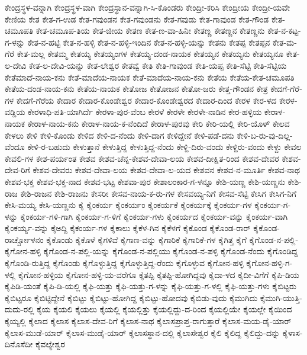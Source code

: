 ಕೇಂದ್ರಸ್ಥಳ-ವನ್ನಾಗಿ
ಕೇಂದ್ರಸ್ಥಳ-ವಾಗಿ
ಕೇಂದ್ರಸ್ಥಾನ-ವನ್ನಾಗಿ-ಸಿ-ಕೊಂಡರು
ಕೇಂದ್ರೀ-ಕರಿಸಿ
ಕೇಂದ್ರೀಯ
ಕೇಂದ್ರೀ-ಯವೇ
ಕೇಣಿಯ
ಕೇತ
ಕೇತ-ಗ-ಉಡ
ಕೇತ-ಗವುಂಡನ
ಕೇತ-ಗವುಂಡನು
ಕೇತ-ಗವುಡು
ಕೇತ-ಗಾವುಂಡ
ಕೇತ-ಗೌಂಡ
ಕೇತ-ಚಮೂಪತಿ
ಕೇತ-ಚಮೂಪ-ತಿಯ
ಕೇತ-ಜೀಯ
ಕೇತಣ
ಕೇತ-ಣ-ವಾ-ಹಿನೀ
ಕೇತಣ್ಣ
ಕೇತಣ್ಣನ
ಕೇತಣ್ಣನು
ಕೇತ-ನ-ಕಟ್ಟ-ಗ-ಳನ್ನು
ಕೇತ-ನ-ಹಟ್ಟಿ
ಕೇತ-ನ-ಹಳ್ಳಿ
ಕೇತ-ನ-ಹಳ್ಳಿ-ಇಂದಿನ
ಕೇತ-ನ-ಹಳ್ಳಿ-ಯನ್ನು
ಕೇತನು
ಕೇತಪ್ಪ
ಕೇತಪ್ಪನ
ಕೇತ-ಮ-ಗೆರೆ
ಕೇತ-ಮಲ್ಲ
ಕೇತಮ್ಮ
ಕೇತಯ್ಯ
ಕೇತಯ್ಯಂಗಳ
ಕೇತಯ್ಯ-ದಂಡ-ನಾಯಕ
ಕೇತಯ್ಯನ
ಕೇತಯ್ಯನು
ಕೇತಯ್ಯನೂ
ಕೇತ-ಲ-ದೇವಿ
ಕೇತ-ಲ-ದೇವಿ-ಯನ್ನು
ಕೇತ-ಲೇಶ್ವರ
ಕೇತವ್ವೆ
ಕೇತಿ
ಕೇತಿ-ಗಾವುಂಡ
ಕೇತಿ-ಯಪ್ಪ
ಕೇತಿ-ಸೆಟ್ಟಿ
ಕೇತಿ-ಸೆಟ್ಟಿಯ
ಕೇತೆಮಾದೆ-ನಾಯ-ಕನು
ಕೇತೆ-ಮಾದೆಯ-ನಾಯಕ
ಕೇತೆ-ಮಾದೆಯ-ನಾಯ-ಕನು
ಕೇತೆಯ
ಕೇತೆಯ-ಕೇತ-ಚಮೂಪತಿ
ಕೇತೆಯ-ದಂಡ-ನಾಯ-ಕನು
ಕೇತೆಯ-ನಾಯಕ
ಕೇತೋಜ
ಕೇತೋಜನ
ಕೇತೋ-ಜರು
ಕೇತ್ತ-ಗೌಂಡನ
ಕೇತ್ರ
ಕೇದಗೆ-ಗೆರೆ-ಗಳ
ಕೇದಗೆ-ಗೆರೆಯ
ಕೇದಾರ
ಕೇದಾರ-ಕೊಂಡೇಶ್ವರ
ಕೇದಾರ-ಕೊಂಡೇಶ್ವರದ
ಕೇದಾರ-ದಿಂದ
ಕೇರಳ
ಕೇರ-ಳದ
ಕೇರಳ-ವಡ್ಡಿಯ
ಕೇರಳಾಧಿ-ಪತಿ-ಯಾಗಿರ್ದೆ
ಕೇರಳಾ-ಪುರ-ವೆಂಬ
ಕೇರಳೆ
ಕೇರಳೇ
ಕೇರಳೇ-ನಾಡಿನ
ಕೇರ-ಹಳ್ಳಿಯ
ಕೇರಾಳ-ನಾಯಕ
ಕೇರಾಳ-ನಾಯ-ಕನು
ಕೇರಾಳ-ನಾಯ-ಕ-ನೆಂದಿದೆ
ಕೇರಾಳ-ಪುರವು
ಕೇರಿ
ಕೇರಿ-ಯಲ್ಲಿ
ಕೇರಿ-ಯೊಳ್
ಕೇಲವ
ಕೇಳಲು
ಕೇಳಿ
ಕೇಳಿ-ಕೊಂಡು
ಕೇಳಿದ
ಕೇಳಿ-ದ-ನೆಂದು
ಕೇಳಿ-ದಾಗ
ಕೇಳಿದ್ದೇನೆ
ಕೇಳಿ-ಪಡೆ-ದನು
ಕೇಳಿ-ಬ-ರು-ವು-ದಿಲ್ಲ-ವೆಂದೂ
ಕೇಳಿ-ರ-ಬಹುದು
ಕೇಳುತ್ತಾನೆ
ಕೇಳುತ್ತಿದ್ದ
ಕೇಳುತ್ತಿದ್ದ-ನೆಂದು
ಕೇಳ್ದಿ-ದಿರು-ವಂದು
ಕೇಳ್ದಿರು-ವಂದು
ಕೇಳ್ದು
ಕೇವಲ
ಕೇವಲಿ-ಗಳ
ಕೇಶ-ಪರ್ಯಂತ
ಕೇಶವ
ಕೇಶವ-ಚೆನ್ನ-ಕೇಶವ-ದೇವಾ-ಲಯ
ಕೇಶವ-ದೀಕ್ಷಿತ-ರಿಂದ
ಕೇಶವ-ದೇವರ
ಕೇಶವ-ದೇವ-ರಿಗೆ
ಕೇಶವ-ದೇವರು
ಕೇಶವ-ದೇವಾ-ಲಯ
ಕೇಶವ-ದೇವಾ-ಲ-ಯದ
ಕೇಶವನ
ಕೇಶವ-ನ-ಮೂರ್ತಿ
ಕೇಶವ-ನಾಥ
ಕೇಶವ-ಭಕ್ತ
ಕೇಶವ-ಭಕ್ತ-ನಾದ
ಕೇಶವ-ಭಟ್ಟ
ಕೇಶವಾ-ಪುರ
ಕೇಶಾಲಂಕಾರ-ಗ-ಳನ್ನೂ
ಕೇಶಿ-ಯಣ್ಣ
ಕೇಶಿ-ಯಣ್ಣನು
ಕೇಶಿ-ರಾಜ
ಕೇಶಿ-ರಾಜನ
ಕೇಶಿ-ರಾಜನು
ಕೇಸರೀ
ಕೇಸವ-ನಾಯ-ಕ-ರು-ಗಳ
ಕೇಸವಯ್ಯ-ನಿಗೆ
ಕೇಸವ-ಸೆಟ್ಟಿ
ಕೇಸಿಗ
ಕೇಸಿಗ-ನಿಗೆ
ಕೇಸಿ-ಮಯ್ಯ
ಕೇಸಿ-ಯಣ್ಣನು
ಕೈ
ಕೈಂಕರ್ಯ
ಕೈಂಕರ್ಯಂ
ಕೈಂಕರ್ಯಕೆ
ಕೈಂಕರ್ಯಕ್ಕೆ
ಕೈಂಕರ್ಯ-ಗಳ
ಕೈಂಕರ್ಯ-ಗ-ಳನ್ನು
ಕೈಂಕರ್ಯ-ಗಳಿ-ಗಾಗಿ
ಕೈಂಕರ್ಯ-ಗ-ಳಿಗೆ
ಕೈಂಕರ್ಯ-ಗಳು
ಕೈಂಕರ್ಯದ
ಕೈಂಕರ್ಯ-ವನ್ನು
ಕೈಂಕರ್ಯ-ವಾಗಿ
ಕೈಂಕರ್ಯ್ಯ-ವನ್ನು
ಕೈಅದ್ದಿ
ಕೈಕಂರ್ಯ-ಗಳ
ಕೈಕಾಲು
ಕೈಕೆಳ-ಗಿನ
ಕೈಕೆಳಗೆ
ಕೈಕೊಂಡ
ಕೈಕೊಂಡ-ರಾರ್
ಕೈಕೊಂಡ-ರಾರ್ಚ್ಚೋಳನಂ
ಕೈಕೊಂಡು
ಕೈಕೊಳೆ
ಕೈಗಳಿವೆ
ಕೈಗಾಣ-ವನ್ನು
ಕೈಗಾರಿಕೆ
ಕೈಗಾರಿಕೆ-ಗಳ
ಕೈಗಿತ್ತ
ಕೈಗೆ
ಕೈಗೊಂಡ-ನ-ಪಲ್ಲಿ-ಕೈಗೋನ-ಹಳ್ಳಿ
ಕೈಗೊಂಡ-ನ-ಪಲ್ಲಿ-ಯನ್ನು
ಕೈಗೊಂಡ-ನ-ಪಲ್ಲಿಯು
ಕೈಗೊಂಡ-ನ-ಪಳ್ಳಿ
ಕೈಗೊಂಡ-ನೆಂದು
ಕೈಗೊಂಡಿದ್ದ
ಕೈಗೊಂಡಿ-ರುತ್ತಿದ್ದ
ಕೈಗೊಂಡು
ಕೈಗೊಳ್ಳುತ್ತಿದ್ದ
ಕೈಗೊಳ್ಳುತ್ತಿದ್ದ-ರೆಂದು
ಕೈಗೊಳ್ಳುವ
ಕೈಗೋನ-ಹಳ್ಳಿ
ಕೈಗೋನ-ಹಳ್ಳಿ-ಗ-ಳಲ್ಲಿ
ಕೈಗೋನ-ಹಳ್ಳಿಯ
ಕೈಗೋನ-ಹಳ್ಳಿ-ಯ-ವರೆಗೂ
ಕೈತಪ್ಪಿ
ಕೈತಪ್ಪಿ-ಹೋಗಿದ್ದವು
ಕೈದಾ-ಳದ
ಕೈದೀ-ವಿಗೆಗೆ
ಕೈಪಿ-ಡಿಯ
ಕೈಪಿಡಿ-ಯಂತೆ
ಕೈಪಿ-ಡಿ-ಯಲ್ಲಿ
ಕೈಫಿ-ಯತ್ತು
ಕೈಫಿ-ಯತ್ತು-ಗ-ಳನ್ನು
ಕೈಫಿ-ಯತ್ತು-ಗ-ಳಲ್ಲಿ
ಕೈಫಿ-ಯತ್ತು-ಗಳು
ಕೈಬಿಟ್ಟರು
ಕೈಬಿಟ್ಟರೂ
ಕೈಬಿಟ್ಟಿದ್ದೇನೆ
ಕೈಬಿಟ್ಟು
ಕೈಬಿಟ್ಟು-ಹೋಗಿದ್ದ
ಕೈಬಿಟ್ಟು-ಹೋದವು
ಕೈಬಿಡು-ವುದು
ಕೈಮುಗಿದು
ಕೈಮುಗಿ-ಯುತ್ತಿ-ದುದು-ರಲ್ಲಿ
ಕೈಯ
ಕೈಯಲಿ
ಕೈಯಲು
ಕೈಯಲ್ಲಿ
ಕೈಯಲ್ಲಿತ್ತು
ಕೈಯಲ್ಲಿದ್ದು-ದ-ರಿಂದ
ಕೈಯಲ್ಲಿಯೇ
ಕೈಯಲ್ಲೇ
ಕೈಯಿಂದ
ಕೈಯ್ಯಲ್ಲಿ
ಕೈಲಾದ
ಕೈಲಾಸ
ಕೈಲಾಸ-ದೇವ-ರಿಗೆ
ಕೈಲಾಸ-ನಾಥ
ಕೈಲಾಸಪ್ರಾಪ್ತ-ರಾಗುತ್ತಾರೆ
ಕೈಲಾಸ-ಮಯ-ಡೈ-ಯಾರ್
ಕೈಲಾಸ-ಮುಡೆ-ಯಾರ್
ಕೈಲಾಸ-ಮುಡೈ-ಯಾರ್
ಕೈಲಾಸಸ್ಥಾನ-ದಲ್ಲಿ
ಕೈಲಾಸೇಶ್ವರ
ಕೈಲಿ
ಕೈಲಿದ್ದ
ಕೈಲಿದ್ದು-ದನ್ನು
ಕೈಳಾಸ-ದಿನೊಸೆದೀ
ಕೈವಲ್ಯೇಶ್ವರ
